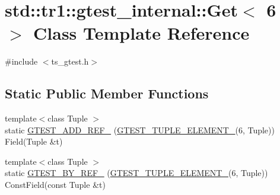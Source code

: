 \hypertarget{classstd_1_1tr1_1_1gtest__internal_1_1Get_3_016_01_4}{\section{std\-:\-:tr1\-:\-:gtest\-\_\-internal\-:\-:Get$<$ 6 $>$ Class Template Reference}
\label{classstd_1_1tr1_1_1gtest__internal_1_1Get_3_016_01_4}
}


{\ttfamily \#include $<$ts\-\_\-gtest.\-h$>$}

\subsection*{Static Public Member Functions}
\begin{DoxyCompactItemize}
\item 
{\footnotesize template$<$class Tuple $>$ }\\static \hyperlink{classstd_1_1tr1_1_1gtest__internal_1_1Get_3_016_01_4_a28034152d066c8644fa55e9fc0e3a12d}{G\-T\-E\-S\-T\-\_\-\-A\-D\-D\-\_\-\-R\-E\-F\-\_\-} (\hyperlink{ts__gtest_8h_a1b7f133d8aa02e0b7afed7b66781eeb7}{G\-T\-E\-S\-T\-\_\-\-T\-U\-P\-L\-E\-\_\-\-E\-L\-E\-M\-E\-N\-T\-\_\-}(6, Tuple)) Field(Tuple \&t)
\item 
{\footnotesize template$<$class Tuple $>$ }\\static \hyperlink{classstd_1_1tr1_1_1gtest__internal_1_1Get_3_016_01_4_a6e396b998757e0ab9b75db0c68a7c360}{G\-T\-E\-S\-T\-\_\-\-B\-Y\-\_\-\-R\-E\-F\-\_\-} (\hyperlink{ts__gtest_8h_a1b7f133d8aa02e0b7afed7b66781eeb7}{G\-T\-E\-S\-T\-\_\-\-T\-U\-P\-L\-E\-\_\-\-E\-L\-E\-M\-E\-N\-T\-\_\-}(6, Tuple)) Const\-Field(const Tuple \&t)
\end{DoxyCompactItemize}


